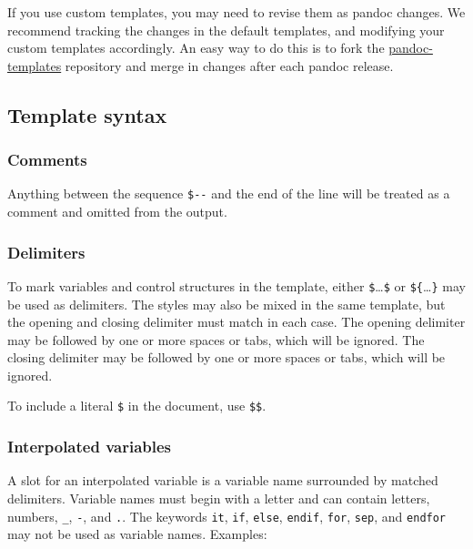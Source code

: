 \documentclass[]{article}
\begin{document}
If you use custom templates, you may need to revise them as pandoc
changes. We recommend tracking the changes in the default templates, and
modifying your custom templates accordingly. An easy way to do this is
to fork the
\href{https://github.com/jgm/pandoc-templates}{pandoc-templates}
repository and merge in changes after each pandoc release.

\hypertarget{template-syntax}{%
\subsection{Template syntax}\label{template-syntax}}

\hypertarget{comments}{%
\subsubsection{Comments}\label{comments}}

Anything between the sequence \texttt{\$-\/-} and the end of the line
will be treated as a comment and omitted from the output.

\hypertarget{delimiters}{%
\subsubsection{Delimiters}\label{delimiters}}

To mark variables and control structures in the template, either
\texttt{\$}\ldots{}\texttt{\$} or \texttt{\$\{}\ldots{}\texttt{\}} may
be used as delimiters. The styles may also be mixed in the same
template, but the opening and closing delimiter must match in each case.
The opening delimiter may be followed by one or more spaces or tabs,
which will be ignored. The closing delimiter may be followed by one or
more spaces or tabs, which will be ignored.

To include a literal \texttt{\$} in the document, use \texttt{\$\$}.

\hypertarget{interpolated-variables}{%
\subsubsection{Interpolated variables}\label{interpolated-variables}}

A slot for an interpolated variable is a variable name surrounded by
matched delimiters. Variable names must begin with a letter and can
contain letters, numbers, \texttt{\_}, \texttt{-}, and \texttt{.}. The
keywords \texttt{it}, \texttt{if}, \texttt{else}, \texttt{endif},
\texttt{for}, \texttt{sep}, and \texttt{endfor} may not be used as
variable names. Examples:
\end{document}
